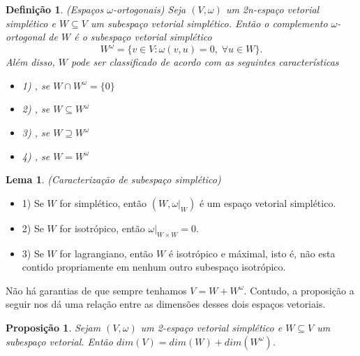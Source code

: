 \documentclass{beamer}
\newtheorem{lema}[teorema]{Lema}
\newtheorem{definicao}[teorema]{Definição}
\newtheorem{proposicao}[teorema]{Proposição}
\newcommand{\espacoSimpleticoOrtogonal}[1]{#1^{\omega}}
\begin{document}
\begin{frame}
	\begin{definicao}
		(Espaços $\omega$-ortogonais) Seja $(V, \omega)$ um 2n-espaço vetorial simplético e $W\subseteq V$ um subespaço vetorial simplético. Então o complemento $\omega$-ortogonal de $W$ é o subespaço vetorial simplético
		$$
		W^{\omega} = \{v\in V: \omega(v,u) = 0,\;\forall u\in W \}.
		$$
		Além disso, $W$ pode ser classificado de acordo com as seguintes características
		\begin{itemize}
		\item 1) , se $W\cap \espacoSimpleticoOrtogonal{W} = \{0\}$
			
		\item 2) , se $W \subseteq \espacoSimpleticoOrtogonal{W}$
		
		\item 3) , se $W\supseteq \espacoSimpleticoOrtogonal{W}$
		
		\item 4) , se $W =\espacoSimpleticoOrtogonal{W}$
		\end{itemize}
	\end{definicao}
\end{frame}

\begin{frame}
	\begin{lema}
		(Caracterização de subespaço simplético)
	\end{lema}
	\begin{itemize}
		\item 1) Se $W$ for simplético, então $(W, \omega|_{W})$ é um espaço vetorial simplético.
		
		\item 2) Se $W$ for isotrópico, então $\omega|_{W\times W} = 0$.
		
		\item 3) Se $W$ for lagrangiano, então $W$ é isotrópico e máximal, isto é, não esta contido propriamente em nenhum outro subespaço isotrópico. 
	\end{itemize}
	Não há garantias de que sempre tenhamos $V = W + \espacoSimpleticoOrtogonal{W}$. Contudo, a proposição a seguir nos dá uma relação entre as dimensões desses dois espaços vetoriais.
	
	\begin{proposicao}
		Sejam $(V,\omega)$ um 2-espaço vetorial simplético e $W \subseteq V$ um subespaço vetorial. Então $dim(V) = dim(W) + dim(\espacoSimpleticoOrtogonal{W})$.
	\end{proposicao}
\end{frame}
\end{document}
